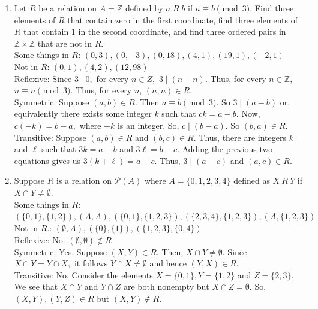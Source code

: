 \documentclass[12pt]{article}
\newcommand{\Z}{\mathbb{Z}}
\begin{document}
\begin{enumerate}
$R=\{(0,0), (1,0), (2,0),(3,0),(4,0),(1,1),(1,2),(1,3),(1,4),(2,2),(2,4),(3,3),(4,4)\}$\\
By inspection, it is reflexive and transitive. It is not symmetric since $(0,1) \in R$ but $(1,0) \not \in R.$ \\ Add 12 since all elements of $A$ will divide it.
\vfill
\item Let $R$ be a relation on $A=\Z$ defined by $a \;R\; b$ if $a \equiv b \pmod 3.$ Find three elements of $R$ that contain zero in the first coordinate, find three elements of $R$ that contain 1 in the second coordinate, and find three ordered pairs in $\Z \times \Z$ that are not in $R.$\\
Some things in $R$: $(0,3), (0,-3), (0,18), (4,1), (19, 1), (-2,1)$\\
Not in $R$: $(0,1), (4,2), (12,98)$\\
Reflexive: Since  $3 \mid 0,$ for every $n \in Z,$ $3 \mid (n-n).$ Thus, for every $n \in \Z,$ $n \equiv n \pmod 3.$ Thus, for every $n$, $(n,n) \in R.$\\
Symmetric: Suppose $(a,b) \in R.$ Then $a \equiv b \pmod 3$. So $3 \mid (a-b)$ or, equivalently there exists some integer $k$ such that $ck=a-b.$ Now, $c(-k)=b-a,$ where $-k$ is an integer. So, $c \mid (b-a).$ So $(b,a) \in R.$\\
Transitive: Suppose $(a,b) \in R$ and $(b,c) \in R.$ Thus, there are integers $k$ and $\ell$ such that $3k=a-b$ and $3\ell = b-c.$ Adding the previous two equations gives us $3(k+\ell)=a-c.$ Thus, $3 \mid (a-c)$ and $(a,c) \in R.$


\item Suppose $R$ is a relation on $\mathcal{P}(A)$ where $A=\{0,1,2,3,4\}$ defined as $X \: R \: Y$ if $X \cap Y \not = \emptyset.$\\
Some things in $R:$ $(\{0,1\}, \{1,2\}), (A,A),  (\{0,1\}, \{1,2,3\}), (\{2,3,4\}, \{1,2,3\}),(A, \{1,2,3\})$\\
Not in $R.$: $(\emptyset, A), (\{0\}, \{1\}), (\{1,2,3\},\{0,4\})$\\
Reflexive: No. $(\emptyset, \emptyset) \not \in R$\\
Symmetric: Yes. Suppose $(X,Y) \in R.$ Then, $X \cap Y \not = \emptyset.$ Since $X \cap Y=Y \cap X,$ it follows $Y \cap X \not = \emptyset$ and hence $(Y,X) \in R.$\\
Transitive: No. Consider the elements $X=\{0,1\}, Y=\{1,2\}$ and $Z=\{2,3\}$. We see that $X \cap Y$ and $Y\cap Z$ are both nonempty but $X \cap Z = \emptyset.$ So, $(X,Y),(Y,Z) \in R$ but $(X,Y) \not \in R.$
\end{enumerate}
\end{document}
